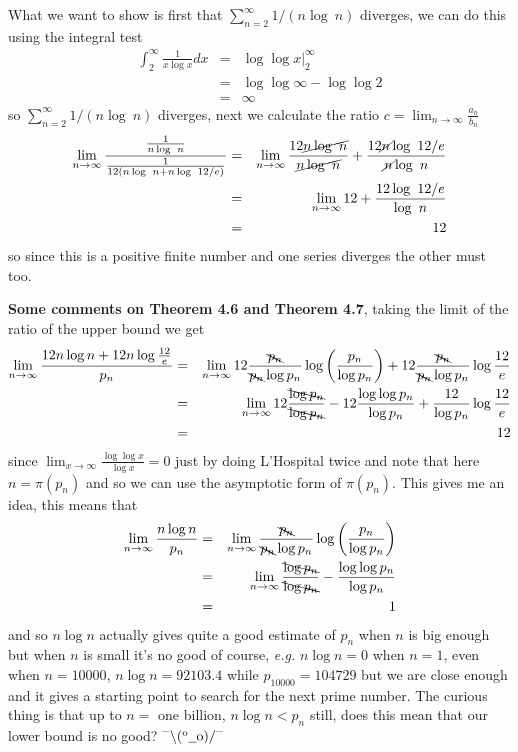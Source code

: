 \documentclass[aps,preprint,preprintnumbers,nofootinbib,showpacs,prd]{revtex4-1}
\newcommand{\eg}{{\it e.g.} }
\newcommand{\nbea}{\begin{eqnarray*}}
\newcommand{\neea}{\end{eqnarray*}}
\newcommand{\dunno}{$ {}^{\mbox {--}}\backslash(^{\rm o}{}\underline{\hspace{0.2cm}}{\rm o})/^{\mbox {--}}$}
\begin{document}
What we want to show is first that $\sum_{n=2}^{\infty} 1/(n \log~n)$ diverges, we can do this using the integral test
%
\nbea
\int_2^\infty \frac{1}{x \log x} dx & = & \left . \log \log x \right |_2^{\infty} \\
& = & \log \log \infty - \log \log 2 \\
& = & \infty
\neea
%
so $\sum_{n=2}^{\infty} 1/(n \log~n)$ diverges, next we calculate the ratio $c = \lim_{n\to\infty}\frac{a_n}{b_n}$
%
\nbea
\lim_{n\to\infty} \frac{\frac{1}{n\log~n}}{\frac{1}{12(n\log~n + n\log~12/e)}} & = & \lim_{n\to\infty} \frac{12 \cancel{n \log~n}}{\cancel{n\log~n}} + \frac{12\cancel{n}\log~12/e}{\cancel{n}\log~n} \\
& = & \lim_{n\to\infty} 12 + \frac{12 \log~12/e}{\log~n} \\
& = & 12
\neea
%
so since this is a positive finite number and one series diverges the other must too.

{\bf Some comments on Theorem 4.6 and Theorem 4.7}, taking the limit of the ratio of the upper bound we get
%
\nbea
\lim_{n\to\infty} \frac{12 n \log n + 12 n \log\frac{12}{e}}{p_n} & = & \lim_{n\to\infty} 12 \frac{\bcancel{p_n}}{\bcancel{p_n}\log p_n} \log \left ( \frac{p_n}{\log p_n}\right ) + 12 \frac{\bcancel{p_n}}{\bcancel{p_n}\log p_n} \log\frac{12}{e} \\
& = & \lim_{n\to\infty} 12 \frac{\bcancel{\log p_n}}{\bcancel{\log p_n}} - 12 \frac{\log \log p_n}{\log p_n} + \frac{12}{\log p_n} \log\frac{12}{e} \\
& = & 12
\neea
%
since $\lim_{x\to\infty} \frac{\log\log x}{\log x} = 0$ just by doing L'Hospital twice and note that here $n=\pi(p_n)$ and so we can use the asymptotic form of $\pi(p_n)$. This gives me an idea, this means that
%
\nbea
\lim_{n\to\infty} \frac{n \log n}{p_n} & = & \lim_{n\to\infty} \frac{\bcancel{p_n}}{\bcancel{p_n}\log p_n} \log \left ( \frac{p_n}{\log p_n}\right ) \\
& = & \lim_{n\to\infty} \frac{\bcancel{\log p_n}}{\bcancel{\log p_n}} - \frac{\log \log p_n}{\log p_n} \\
& = & 1
\neea
%
and so $n\log n$ actually gives quite a good estimate of $p_n$ when $n$ is big enough but when $n$ is small it's no good of course, \eg $n\log n=0$ when $n=1$, even when $n=10000$, $n\log n = 92103.4$ while $p_{10000} = 104729$ but we are close enough and it gives a starting point to search for the next prime number. The curious thing is that up to $n=$ one billion, $n\log n < p_n$ still, does this mean that our lower bound is no good? \dunno
\end{document}

